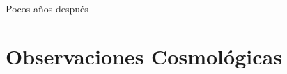 Pocos años después	








\section{Observaciones Cosmológicas}
\label{sec:CosmologicalObservations}
	
